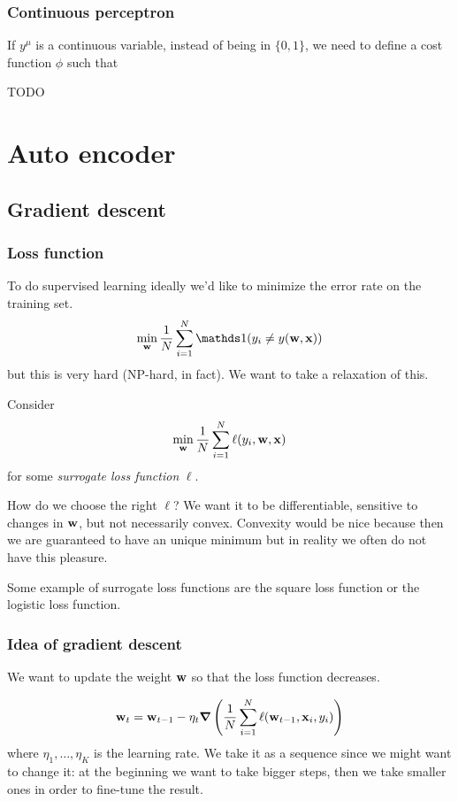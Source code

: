 \documentclass[12pt]{extarticle}
\renewcommand{\vec}[1]{\bvec{#1}}
\begin{document}
\subsubsection{Continuous perceptron}
If $y^\mu$ is a continuous variable, instead of being in $\{0, 1\}$, we need to define a cost
function $\phi$ such that

TODO

\section{Auto encoder}

\subsection{Gradient descent}
\label{sec:gradient-descent}
\subsubsection{Loss function}

To do supervised learning ideally we'd like to minimize the error rate on the training set.
\begin{equation}
	\min_{\vec w} \frac{1}{N} \sum_{i = 1}^N \mathds 1(y_i \neq y(\vec w, \vec x))
\end{equation}
but this is very hard (NP-hard, in fact). We want to take a relaxation of this.

Consider
\begin{equation}
	\min_{\vec w} \frac{1}{N} \sum_{i = 1}^N \ell(y_i, \vec w, \vec x)
\end{equation}
for some \emph{surrogate loss function} $\ell$.

How do we choose the right $\ell$? We want it to be differentiable, sensitive to changes in
$\vec w$, but not necessarily convex.
Convexity would be nice because then we are guaranteed to have an unique minimum but in reality we
often do not have this pleasure.

Some example of surrogate loss functions are the square loss function or the logistic loss function.

\subsubsection{Idea of gradient descent}

We want to update the weight $\vec w$ so that the loss function decreases.

\begin{equation}
	\vec w_{t} = \vec w_{t-1} - \eta_t \grad \left(\frac{1}{N}\sum_{i = 1}^N
	\ell(\vec w_{t-1}, \vec x_i, y_i) \right)
\end{equation}
where $\eta_1, \dots, \eta_K$ is the learning rate. We take it as a sequence since we might want to
change it: at the beginning we want to take bigger steps, then we take smaller ones in order to
fine-tune the result.
\end{document}
